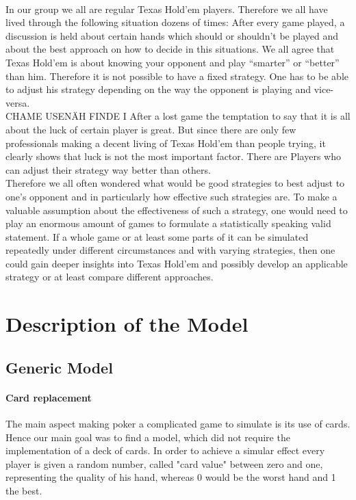 \documentclass[11pt]{article}
\begin{document}
\\							
In our group we all are regular Texas Hold’em players. Therefore we all have lived through the following situation dozens of times: After every game played, a discussion is held about certain hands which should or shouldn’t be played and about the best approach on how to decide in this situations. We all agree that Texas Hold’em is about knowing your opponent and play “smarter” or “better” than him. Therefore it is not possible to have a fixed strategy. One has to be able to adjust his strategy depending on the way the opponent is playing and vice-versa.
\\
CHAME USENÄH FINDE I
After a lost game the temptation to say that it is all about the luck of certain player is great. But since there are only few professionals making a decent living of Texas Hold’em than people trying, it clearly shows that luck is not the most important factor. There are Players who can adjust their strategy way better than others.\\ 
Therefore we all often wondered what would be good strategies to best adjust to one’s opponent and in particularly how effective such strategies are. To make a valuable assumption about the effectiveness of such a strategy, one would need to play an enormous amount of games to formulate a statistically speaking valid statement. If a whole game or at least some parts of it can be simulated repeatedly under different circumstances and with varying strategies, then one could gain deeper insights into Texas Hold’em and possibly develop an applicable strategy or at least compare different approaches.

\section{Description of the Model}

\subsection{Generic Model}

\paragraph{Card replacement}
The main aspect making poker a complicated game to simulate is its use of cards. Hence our main goal was to find a model, which did not require the implementation of a deck of cards. In order to achieve a simular effect every player is given a random number, called "card value" between zero and one, representing the quality of his hand, whereas 0 would be the worst hand and 1 the best. 
\end{document}
